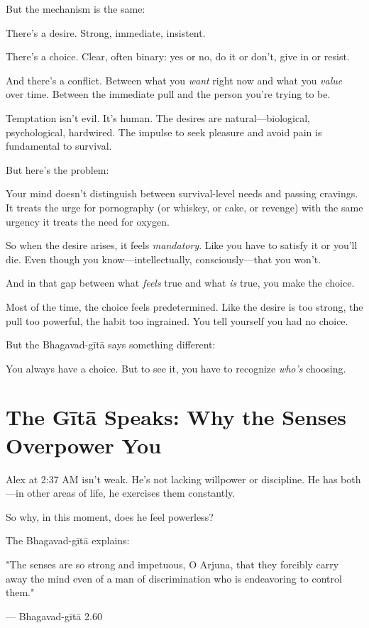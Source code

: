 \documentclass[11pt,twoside]{book}
\begin{document}
But the mechanism is the same:

There's a desire. Strong, immediate, insistent.

There's a choice. Clear, often binary: yes or no, do it or don't, give in or resist.

And there's a conflict. Between what you \emph{want} right now and what you \emph{value} over time. Between the immediate pull and the person you're trying to be.

Temptation isn't evil. It's human. The desires are natural—biological, psychological, hardwired. The impulse to seek pleasure and avoid pain is fundamental to survival.

But here's the problem:

Your mind doesn't distinguish between survival-level needs and passing cravings. It treats the urge for pornography (or whiskey, or cake, or revenge) with the same urgency it treats the need for oxygen.

So when the desire arises, it feels \emph{mandatory}. Like you have to satisfy it or you'll die. Even though you know—intellectually, consciously—that you won't.

And in that gap between what \emph{feels} true and what \emph{is} true, you make the choice.

Most of the time, the choice feels predetermined. Like the desire is too strong, the pull too powerful, the habit too ingrained. You tell yourself you had no choice.

But the Bhagavad-gītā says something different:

You always have a choice. But to see it, you have to recognize \emph{who's} choosing.

\section*{The Gītā Speaks: Why the Senses Overpower You}

Alex at 2:37 AM isn't weak. He's not lacking willpower or discipline. He has both—in other areas of life, he exercises them constantly.

So why, in this moment, does he feel powerless?

The Bhagavad-gītā explains:

\begin{pullquote}
"The senses are so strong and impetuous, O Arjuna, that they forcibly carry away the mind even of a man of discrimination who is endeavoring to control them."

--- Bhagavad-gītā 2.60
\end{pullquote}
\end{document}

